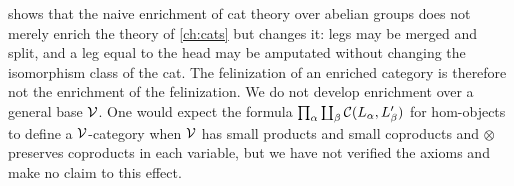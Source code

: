 \begin{remark}\label{rem:enrichment-moral}
 shows that the naive enrichment of cat theory over
abelian groups does not merely enrich the theory of \cref{ch:cats} but changes
it: legs may be merged and split, and a leg equal to the head may be
amputated without changing the isomorphism class of the cat. The
felinization of an enriched category is therefore not the enrichment of the
felinization. We do not develop enrichment over a general base $\mathcal{V}$. One
would expect the formula $\prod_\alpha\coprod_\beta\mathcal{C}(L_\alpha,L'_\beta)$ for
hom-objects to define a $\mathcal{V}$-category when $\mathcal{V}$ has small products and small
coproducts and $\otimes$ preserves coproducts in each variable, but we have not
verified the axioms and make no claim to this effect.
\end{remark}
